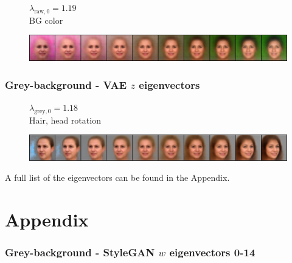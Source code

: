 \documentclass{article}
\begin{document}
\begin{figure}[H]
  \centering
  \begin{minipage}{.18\linewidth}
      \centering
      $\lambda_{\text{raw}, 0} = 1.19$ \\
      BG color
  \end{minipage}%
  \hfill
  \begin{minipage}{.81\linewidth}
      \centering
      \includegraphics[width=\linewidth]{eigen/raw_vae_0.png}
  \end{minipage}
\end{figure}

\subsubsection*{Grey-background - VAE $z$ eigenvectors}

\begin{figure}[H]
  \centering
  \begin{minipage}{.18\linewidth}
      \centering
      $\lambda_{\text{grey}, 0} = 1.18$ \\
      Hair, head rotation
  \end{minipage}%
  \hfill
  \begin{minipage}{.81\linewidth}
      \centering
      \includegraphics[width=\linewidth]{eigen/grey_vae_0.png}
  \end{minipage}
\end{figure}


A full list of the eigenvectors can be found in the Appendix.

\newpage

\newpage
\section*{Appendix}

\subsubsection*{Grey-background - StyleGAN $w$ eigenvectors 0-14}
\end{document}
